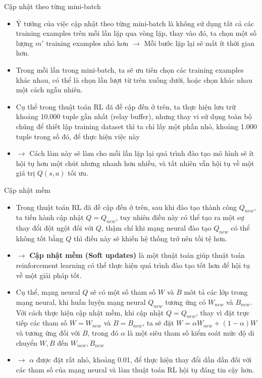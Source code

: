 \documentclass[10pt,aspectratio=169]{beamer}
\begin{document}
\begin{frame}{Cập nhật theo từng mini-batch}{\subsecname}
\begin{itemize}
\setlength\itemsep{8pt}
\item Ý tưởng của việc cập nhật theo từng mini-batch là không sử dụng tất cả các training examples trên mỗi lần lặp qua vòng lặp, thay vào đó, ta chọn một số lượng $ m' $ training examples nhỏ hơn $ \rightarrow $ Mỗi bước lặp lại sẽ mất ít thời gian hơn.
\item Trong mỗi lần trong mini-batch, ta sẽ ưu tiên chọn các training examples khác nhau, có thể là chọn lần lượt từ trên xuống dưới, hoặc chọn khác nhau một cách ngẫu nhiên.
\item Cụ thể trong thuật toán RL đã đề cập đến ở trên, ta thực hiện lưu trữ khoảng 10.000 tuple gần nhất (relay buffer), nhưng thay vi sử dụng toàn bộ chúng để thiết lập training dataset thì ta chỉ lấy một phần nhỏ, khoảng 1.000 tuple trong số đó, để thực hiện việc này
\item[] $ \longrightarrow $ Cách làm này sẽ làm cho mỗi lần lặp lại quá trình đào tạo mô hình sẽ ít hội tụ hơn một chút nhưng nhanh hơn nhiều, và tất nhiên vẫn hội tụ về một giá trị $ Q(s,a) $ tối ưu.
\end{itemize}
\end{frame}

\begin{frame}{\hypertarget{softupdate}{Cập nhật mềm}}{\subsecname}
\begin{itemize}
\setlength\itemsep{8pt}
\item Trong thuật toán RL đã đề cập đến ở trên, sau khi đào tạo thành công $ Q_{new} $, ta tiến hành cập nhật $ Q = Q_{new} $, tuy nhiên điều này có thể tạo ra một sự thay đổi đột ngột đối với $ Q $, thậm chí khi mạng neural đào tạo $ Q_{new} $ có thể không tốt bằng $ Q $ thì điều này sẽ khiến hệ thống trở nên tồi tệ hơn.
\item[] $ \longrightarrow $ \textbf{Cập nhật mềm (Soft updates)} là một thuật toán giúp thuật toán reinforcement learning có thể thực hiện quá trình đào tạo tốt hơn để hội tụ về một giải pháp tốt.
\item Cụ thể, mạng neural $ Q $ sẽ có một số tham số $ W $ và $ B $ môt tả các lớp trong mạng neural, khi huấn luyện mạng neural $ Q_{new} $ tương ứng có $ W_{new} $ và $ B_{new} $. Với cách thực hiện cập nhật mềm, khi cập nhật $ Q = Q_{new} $, thay vì đặt trực tiếp các tham số $ W = W_{new} $ và $ B = B_{new} $, ta sẽ đặt \textcolor{mainblue}{$ W = \alpha W_{new} + (1 - \alpha) W $} và tương ứng đối với $ B $, trong đó $ \alpha $ là một siêu tham số kiểm soát mức độ di chuyển $ W, B $ đến $ W_{new}, B_{new} $
\item[] $ \longrightarrow $ $ \alpha $ được đặt rất nhỏ, khoảng 0.01, để thực hiện thay đổi dần dần đối với các tham số của mạng neural và làm thuật toán RL hội tụ đáng tin cậy hơn.
\end{itemize}
\end{frame}
\end{document}
